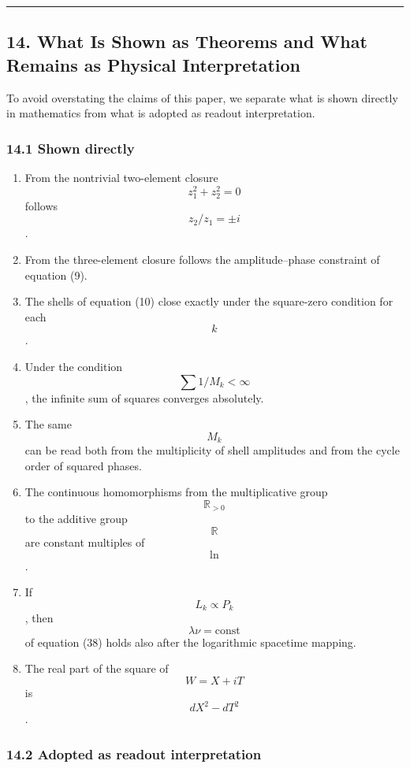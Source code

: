 \documentclass[
  a4paper,
]{article}
\providecommand{\tightlist}{%
  \setlength{\itemsep}{0pt}\setlength{\parskip}{0pt}}
\begin{document}
\begin{center}\rule{0.5\linewidth}{0.5pt}\end{center}

\subsection{14. What Is Shown as Theorems and What Remains as Physical
Interpretation}\label{what-is-shown-as-theorems-and-what-remains-as-physical-interpretation}

To avoid overstating the claims of this paper, we separate what is shown
directly in mathematics from what is adopted as readout interpretation.

\subsubsection{14.1 Shown directly}\label{shown-directly}

\begin{enumerate}
\def\labelenumi{\arabic{enumi}.}
\tightlist
\item
  From the nontrivial two-element closure \[z_1^2+z_2^2=0\] follows
  \[z_2/z_1=\pm i\].
\item
  From the three-element closure follows the amplitude--phase constraint
  of equation (9).
\item
  The shells of equation (10) close exactly under the square-zero
  condition for each \[k\].
\item
  Under the condition \[\sum1/M_k<\infty\], the infinite sum of squares
  converges absolutely.
\item
  The same \[M_k\] can be read both from the multiplicity of shell
  amplitudes and from the cycle order of squared phases.
\item
  The continuous homomorphisms from the multiplicative group
  \[\mathbb R_{>0}\] to the additive group \[\mathbb R\] are constant
  multiples of \[\ln\].
\item
  If \[L_k\propto P_k\], then \[\lambda\nu=\mathrm{const}\] of equation
  (38) holds also after the logarithmic spacetime mapping.
\item
  The real part of the square of \[W=X+iT\] is \[dX^2-dT^2\].
\end{enumerate}

\subsubsection{14.2 Adopted as readout
interpretation}\label{adopted-as-readout-interpretation}
\end{document}

